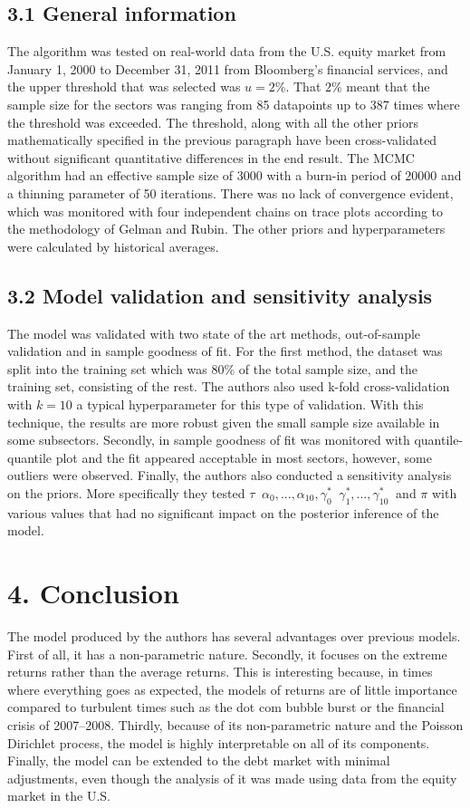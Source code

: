 \documentclass[fleqn, a4paper]{report}
\begin{document}
\subsection*{3.1 General information}
The algorithm was tested on real-world data from the U.S. equity market from January 1, 2000 to December 31, 2011 from Bloomberg's financial services, and the upper threshold that was selected was $u=2\%$. That $2\%$ meant that the sample size for the sectors was ranging from 85 datapoints up to 387 times where the threshold was exceeded. The threshold, along with all the other priors mathematically specified in the previous paragraph have been cross-validated without significant quantitative differences in the end result. The MCMC algorithm had an effective sample size of $3000$ with a burn-in period of $20000$ and a thinning parameter of 50 iterations. There was no lack of convergence evident, which was monitored with four independent chains on trace plots according to the methodology of Gelman and Rubin. The other priors and hyperparameters were calculated by historical averages. 

\subsection*{3.2 Model validation and sensitivity analysis}
The model was validated with two state of the art methods, out-of-sample validation and in sample goodness of fit. For the first method, the dataset was split into the training set which was 80\% of the total sample size, and the training set, consisting of the rest. The authors also used k-fold cross-validation with $k=10$ a typical hyperparameter for this type of validation. With this technique, the results are more robust given the small sample size available in some subsectors. Secondly, in sample goodness of fit was monitored with quantile-quantile plot and the fit appeared acceptable in most sectors, however, some outliers were observed. Finally, the authors also conducted a sensitivity analysis on the priors. More specifically they tested $\tau~$ $\alpha_0,...,\alpha_{10}, \gamma_0^*~$ $\gamma_1^*,...,\gamma_{10}^*~$ and $\pi$ with various values that had no significant impact on the posterior inference of the model.

\section*{4. Conclusion}
The model produced by the authors has several advantages over previous models. First of all, it has a non-parametric nature. Secondly, it focuses on the extreme returns rather than the average returns. This is interesting because, in times where everything goes as expected, the models of returns are of little importance compared to turbulent times such as the dot com bubble burst or the financial crisis of 2007–2008. Thirdly, because of its non-parametric nature and the Poisson Dirichlet process, the model is highly interpretable on all of its components. Finally, the model can be extended to the debt market with minimal adjustments, even though the analysis of it was made using data from the equity market in the U.S.



\end{document}
